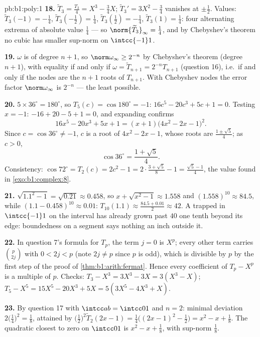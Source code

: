 \begin{solution}{pb:b1:poly:1}
\textbf{18.} $\widetilde T_3 = \frac{T_3}4 = X^3 - \frac34X$;
$\widetilde T_3{}' = 3X^2 - \frac34$ vanishes at $\pm\frac12$.
Values: $\widetilde T_3(-1) = -\frac14$, $\widetilde
T_3(-\tfrac12) = \frac14$, $\widetilde T_3(\tfrac12) = -\frac14$,
$\widetilde T_3(1) = \frac14$: four alternating extrema of
absolute value $\frac14$ --- so $\norm{\widetilde T_3}_\infty =
\frac14$, and by Chebyshev's theorem no  cubic has smaller
sup-norm on $\intcc{-1}1$.

\textbf{19.} $\omega$ is  of degree $n + 1$, so
$\norm\omega_\infty \geq 2^{-n}$ by Chebyshev's theorem (degree
$n+1$), with equality if and only if $\omega = \widetilde T_{n+1}
= 2^{-n}T_{n+1}$ (question 16), i.e.\ if and only if the nodes
are the $n + 1$ roots of $T_{n+1}$. With Chebyshev nodes the error
factor $\norm\omega_\infty$ is $2^{-n}$ --- the least possible.

\textbf{20.} $5 \times 36^\circ = 180^\circ$, so $T_5(c) =
\cos180^\circ = -1$: $16c^5 - 20c^3 + 5c + 1 = 0$. Testing $x =
-1$: $-16 + 20 - 5 + 1 = 0$, and expanding confirms
\[
16x^5 - 20x^3 + 5x + 1 = (x + 1)\bigl(4x^2 - 2x - 1\bigr)^2 .
\]
Since $c = \cos36^\circ \neq -1$, $c$ is a root of $4x^2 - 2x -
1$, whose roots are $\frac{1 \pm \sqrt5}4$; as $c > 0$,
\[
\cos36^\circ = \frac{1 + \sqrt5}4 .
\]
Consistency: $\cos72^\circ = T_2(c) = 2c^2 - 1 = 2\cdot\frac{3 +
\sqrt5}8 - 1 = \frac{\sqrt5 - 1}4$, the value found in
\cref{exo:b1:complex:8}.

\textbf{21.} $\sqrt{1.1^2 - 1} = \sqrt{0.21} \approx 0.458$, so
$x + \sqrt{x^2-1} \approx 1.558$ and $(1.558)^{10} \approx 84.5$,
while $(1.1 - 0.458)^{10} \approx 0.01$: $T_{10}(1.1) \approx
\frac{84.5 + 0.01}2 \approx 42$. A  trapped in
$\intcc{-1}1$ on the interval has already grown past $40$ one
tenth beyond its edge: boundedness on a segment says nothing an
inch outside it.

\textbf{22.} In question 7's formula for $T_p$, the term $j = 0$
is $X^p$; every other term carries $\binom p{2j}$ with $0 < 2j <
p$ (note $2j \neq p$ since $p$ is odd), which is divisible by $p$
by the first step of the proof of \cref{thm:b1:arith:fermat}.
Hence every coefficient of $T_p - X^p$ is a multiple of $p$.
Checks: $T_3 - X^3 = 3X^3 - 3X = 3(X^3 - X)$; $T_5 - X^5 = 15X^5
- 20X^3 + 5X = 5(3X^5 - 4X^3 + X)$.

\textbf{23.} By question 17 with $\intcc ab = \intcc01$ and $n =
2$: minimal deviation $2\bigl(\frac14\bigr)^2 = \frac18$,
attained by $\bigl(\frac12\bigr)^2\widetilde T_2(2x - 1) =
\frac14\bigl((2x-1)^2 - \frac12\bigr) = x^2 - x + \frac18$. The
 quadratic closest to zero on $\intcc01$ is $x^2 - x +
\frac18$, with sup-norm $\frac18$.


\end{solution}
